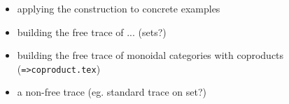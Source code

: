 \begin{itemize}
	\item applying the construction to concrete examples
	\item building the free trace of ... (sets?)
	\item building the free trace of monoidal categories with coproducts (\verb!=>coproduct.tex!)
	\item a non-free trace (eg. standard trace on set?)
\end{itemize}

